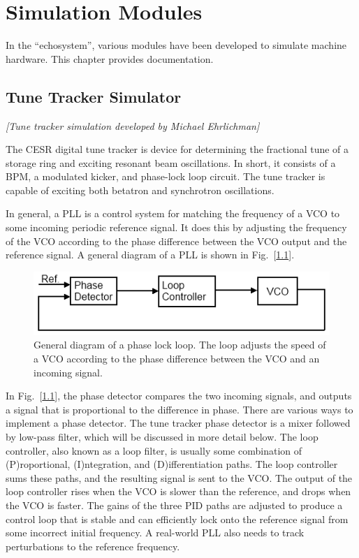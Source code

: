 \chapter{Simulation Modules}

In the \bmad ``echosystem'', various modules have been developed to
simulate machine hardware. This chapter provides documentation.

\section{Tune Tracker Simulator}

\textit{\large [Tune tracker simulation developed by Michael Ehrlichman]}

The CESR digital tune tracker is device for determining the fractional
tune of a storage ring and exciting resonant beam oscillations.  In
short, it consists of a BPM, a modulated kicker, and phase-lock loop
circuit.  The tune tracker is capable of exciting both betatron and
synchrotron oscillations.

In general, a PLL is a control system for matching the frequency of a
VCO to some incoming periodic reference signal.  It does this by
adjusting the frequency of the VCO according to the phase difference
between the VCO output and the reference signal.  A general diagram of
a PLL is shown in Fig.~[\ref{f:PLL}].

\begin{figure}[h]
\centering
\includegraphics{PLL.png}
\caption{
General diagram of a phase lock loop. The loop adjusts the speed of a VCO according to the 
phase difference between the VCO and an incoming signal.}
\label{f:PLL}
\end{figure}

In Fig.~[\ref{f:PLL}], the phase detector compares the two incoming
signals, and outputs a signal that is proportional to the difference
in phase.  There are various ways to implement a phase detector.  The
tune tracker phase detector is a mixer followed by low-pass filter,
which will be discussed in more detail below.  The loop controller,
also known as a loop filter, is usually some combination of
(P)roportional, (I)ntegration, and (D)ifferentiation paths.  The loop
controller sums these paths, and the resulting signal is sent to the
VCO.  The output of the loop controller rises when the VCO is slower
than the reference, and drops when the VCO is faster.  The gains of
the three PID paths are adjusted to produce a control loop that is
stable and can efficiently lock onto the reference signal from some
incorrect initial frequency.  A real-world PLL also needs to track
perturbations to the reference frequency.


